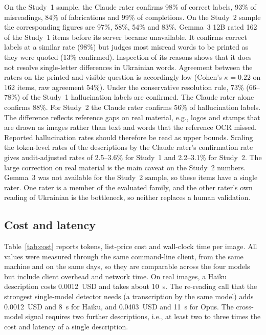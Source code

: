 \documentclass[pdflatex,sn-mathphys-num]{sn-jnl}%
\theoremstyle{thmstyleone}%
\theoremstyle{thmstyletwo}%
\theoremstyle{thmstylethree}%
\newcommand{\RealAdjRange}{2.2--3.1}
\newcommand{\RealAudComplCl}{83}
\newcommand{\RealAudCorrCl}{97}
\newcommand{\RealAudFabCl}{54}
\newcommand{\RealAudHallCl}{56}
\newcommand{\RealAudMisCl}{58}
\newcommand{\RealCostHaikuDesc}{0.0012}
\newcommand{\RealCostHaikuDescSec}{10}
\newcommand{\RealCostHaikuTrans}{0.0012}
\newcommand{\RealCostHaikuTransSec}{8}
\newcommand{\RealCostOpusTrans}{0.0403}
\newcommand{\RealCostOpusTransSec}{11}
\newcommand{\SynAdjRange}{2.5--3.6}
\newcommand{\SynAudAgree}{54}
\newcommand{\SynAudComplCl}{99}
\newcommand{\SynAudCorrCl}{98}
\newcommand{\SynAudCorrGm}{98}
\newcommand{\SynAudFabCl}{84}
\newcommand{\SynAudHall}{73}
\newcommand{\SynAudHallCI}{66--78}
\newcommand{\SynAudHallCl}{88}
\newcommand{\SynAudKappa}{0.22}
\newcommand{\SynAudMisCl}{93}
\newcommand{\SynAudMisGm}{13}
\newcommand{\SynAudNBoth}{162}
\begin{document}
On the Study~1 sample, the Claude rater confirms \SynAudCorrCl\% of correct labels, \SynAudMisCl\% of misreadings, \SynAudFabCl\% of fabrications and \SynAudComplCl\% of completions. On the Study~2 sample the corresponding figures are \RealAudCorrCl\%, \RealAudMisCl\%, \RealAudFabCl\% and \RealAudComplCl\%. Gemma~3 12B rated \SynAudNBoth{} of the Study~1 items before its server became unavailable. It confirms correct labels at a similar rate (\SynAudCorrGm\%) but judges most misread words to be printed as they were quoted (\SynAudMisGm\% confirmed). Inspection of its reasons shows that it does not resolve single-letter differences in Ukrainian words. Agreement between the raters on the printed-and-visible question is accordingly low (Cohen's $\kappa=\SynAudKappa$ on \SynAudNBoth{} items, raw agreement \SynAudAgree\%). Under the conservative resolution rule, \SynAudHall\% (\SynAudHallCI\%) of the Study~1 hallucination labels are confirmed. The Claude rater alone confirms \SynAudHallCl\%. For Study~2 the Claude rater confirms \RealAudHallCl\% of hallucination labels. The difference reflects reference gaps on real material, e.g., logos and stamps that are drawn as images rather than text and words that the reference OCR missed. Reported hallucination rates should therefore be read as upper bounds. Scaling the token-level rates of the descriptions by the Claude rater's confirmation rate gives audit-adjusted rates of \SynAdjRange\% for Study~1 and \RealAdjRange\% for Study~2. The large correction on real material is the main caveat on the Study~2 numbers. Gemma~3 was not available for the Study~2 sample, so these items have a single rater. One rater is a member of the evaluated family, and the other rater's own reading of Ukrainian is the bottleneck, so neither replaces a human validation.

\subsection{Cost and latency}\label{sec:cost}

Table~\ref{tab:cost} reports tokens, list-price cost and wall-clock time per image. All values were measured through the same command-line client, from the same machine and on the same days, so they are comparable across the four models but include client overhead and network time. On real images, a Haiku description costs \RealCostHaikuDesc{}~USD and takes about \RealCostHaikuDescSec{}~s. The re-reading call that the strongest single-model detector needs (a transcription by the same model) adds \RealCostHaikuTrans{}~USD and \RealCostHaikuTransSec{}~s for Haiku, and \RealCostOpusTrans{}~USD and \RealCostOpusTransSec{}~s for Opus. The cross-model signal requires two further descriptions, i.e., at least two to three times the cost and latency of a single description.
\end{document}
